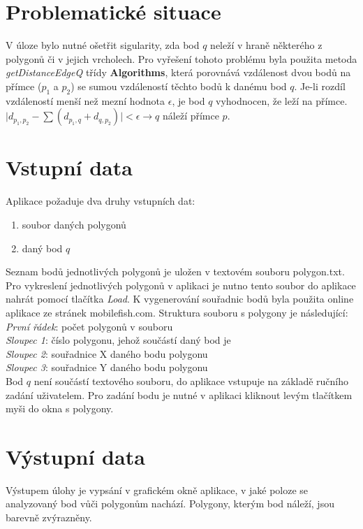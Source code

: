 \documentclass[a4paper, 12pt]{article}
\begin{document}
\section{Problematické situace}
V úloze bylo nutné ošetřit sigularity, zda bod $q$ neleží v hraně některého z polygonů či v jejich vrcholech. Pro vyřešení tohoto problému byla použita metoda \textsl{getDistanceEdgeQ} třídy \textbf{Algorithms}, která porovnává vzdálenost dvou bodů na přímce ($p_1$ a $p_2$) se sumou vzdáleností těchto bodů k danému bod $q$. Je-li rozdíl vzdáleností menší než mezní hodnota $\epsilon$, je bod $q$ vyhodnocen, že leží na přímce.\\

$\mid d_{p_1,p_2} - \sum(d_{p_1,q} + d_{q,p_2}) \mid  < \epsilon \rightarrow q$ náleží přímce $p$.

\section{Vstupní data}
Aplikace požaduje dva druhy vstupních dat:

\begin{enumerate}
\item soubor daných polygonů
\item daný bod $q$
\end{enumerate}

Seznam bodů jednotlivých polygonů je uložen v textovém souboru polygon.txt. Pro vykreslení jednotlivých polygonů v aplikaci je nutno tento soubor do aplikace nahrát pomocí tlačítka \textsl{Load}. K vygenerování souřadnic bodů byla použita online aplikace ze stránek mobilefish.com. Struktura souboru s polygony je následující:\\

\noindent
\textsl{První řádek}: počet polygonů v souboru\\
\textsl{Sloupec 1}: číslo polygonu, jehož součástí daný bod je\\
\textsl{Sloupec 2}: souřadnice X daného bodu polygonu\\
\textsl{Sloupec 3}: souřadnice Y daného bodu polygonu\\

Bod $q$ není součástí textového souboru, do aplikace vstupuje na základě ručního zadání uživatelem. Pro zadání bodu je nutné v aplikaci kliknout levým tlačítkem myši do okna s polygony.

\section{Výstupní data}
Výstupem úlohy je vypsání v grafickém okně aplikace, v jaké poloze se analyzovaný bod vůči polygonům nachází. Polygony, kterým bod náleží, jsou barevně zvýrazněny.
\end{document}
